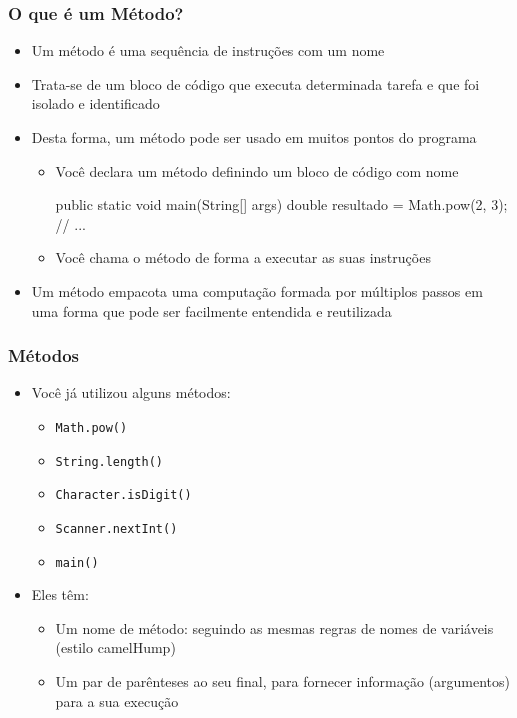 \documentclass[xcolor={dvipsnames,table},aspectratio=169]{beamer}
\begin{document}
\begin{frame}[fragile]\frametitle{O que é um Método?}
\begin{itemize}
	\item Um método é uma sequência de instruções com um nome
	\item Trata-se de um bloco de código que executa determinada tarefa e que foi isolado e identificado
	\item Desta forma, um método pode ser usado em muitos pontos do programa
	\begin{itemize}
		\item Você declara um método definindo um bloco de código com nome
\begin{javacode}
public static void main(String[] args) {
  double resultado = Math.pow(2, 3);
  // ...
}
\end{javacode}
		\item Você chama o método de forma a executar as suas instruções
	\end{itemize}
	\item Um método empacota uma computação formada por múltiplos passos em uma forma que pode ser facilmente entendida e reutilizada
\end{itemize}
\end{frame}

\begin{frame}\frametitle{Métodos}
\begin{itemize}
	\item Você já utilizou alguns métodos:
	\begin{itemize}
		\item \texttt{Math.pow()}
		\item \texttt{String.length()}
		\item \texttt{Character.isDigit()}
		\item \texttt{Scanner.nextInt()}
		\item \texttt{main()}
	\end{itemize}
	\item Eles têm:
	\begin{itemize}
		\item Um nome de método: seguindo as mesmas regras de nomes de variáveis (estilo camelHump)
		\item Um par de parênteses ao seu final, para fornecer informação (argumentos) para a sua execução
	\end{itemize}
\end{itemize}
\end{frame}
\end{document}
